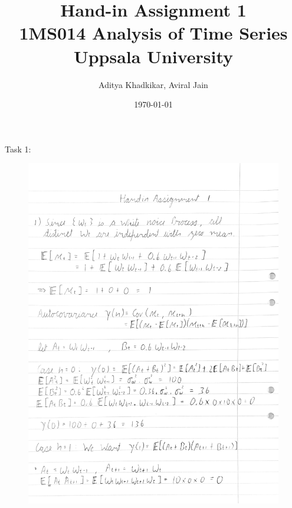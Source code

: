 \documentclass[a4paper,11pt]{article}
\title{\textbf{Hand-in Assignment 1} \\ \LARGE 1MS014 Analysis of Time Series \\ \large Uppsala University}
\author{Aditya Khadkikar, Aviral Jain}
\date{\today}
\begin{document}
    \maketitle

    \newpage
    Task 1:    
    \begin{figure}[H]
        \centering
        \includegraphics[width=1\textwidth]{figure-markdown_strict/1-1.png}
        \label{fig:1}
    \end{figure}
\end{document}
